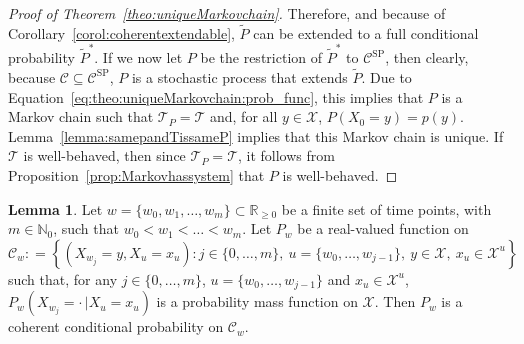 \documentclass[10pt,a4paper]{paper}
\theoremstyle{definition}
\newtheorem{lemma}[theorem]{Lemma}
\newcommand{\nats}{\mathbb{N}}
\newcommand{\reals}{\mathbb{R}}
\newcommand{\states}{\mathcal{X}}
\newcommand{\coloneqq}{:\!=}
\begin{document}
\begin{proof}[Proof of Theorem~\ref{theo:uniqueMarkovchain}]
Therefore, and because of Corollary~\ref{corol:coherentextendable}, $\tilde{P}$ can be extended to a full conditional probability $\tilde{P}^*$. If we now let $P$ be the restriction of $\tilde{P}^*$ to $\mathcal{C}^\mathrm{SP}$, then clearly, because $\mathcal{C}\subseteq\mathcal{C}^\mathrm{SP}$, $P$ is a stochastic process that extends $\tilde{P}$. Due to Equation~\eqref{eq:theo:uniqueMarkovchain:prob_func}, this implies that $P$ is a Markov chain such that $\mathcal{T}_P=\mathcal{T}$ and, for all $y\in\states$, $P(X_0=y)=p(y)$. Lemma~\ref{lemma:samepandTissameP} implies that this Markov chain is unique. If $\mathcal{T}$ is well-behaved, then since $\mathcal{T}_P=\mathcal{T}$, it follows from Proposition~\ref{prop:Markovhassystem} that $P$ is well-behaved.
\end{proof}

\begin{lemma}\label{lemma:simplechaincoherence}
Let $w=\{w_0,w_1,\dots,w_m\}\subset\reals_{\geq0}$ be a finite set of time points, with $m\in\nats_0$, such that $w_0<w_1<\dots<w_m$.
Let $P_w$ be a real-valued function on
\begin{equation*}
\mathcal{C}_w\coloneqq
\left\{
(X_{w_j}=y,X_u=x_u)
\colon 
j\in\{0,\dots,m\},~
u=\{w_0,\dots,w_{j-1}\},~
y\in\states,~
x_u\in\states^u
\right\}
\end{equation*}
such that, for any $j\in\{0,\dots,m\}$, $u=\{w_0,\dots,w_{j-1}\}$ and $x_u\in\states^u$, $P_w(X_{w_j}=\cdot\,\vert X_u=x_u)$ is a probability mass function on $\states$. Then $P_w$ is a coherent conditional probability on $\mathcal{C}_w$.
\end{lemma}
\end{document}
